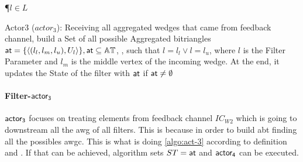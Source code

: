 \begin{algorithm}[h!]
\DontPrintSemicolon
{}
\SetAlgoRefName{[A7]}
\P{$l \in L$}
\FS{$\dwi \subseteq \dw$}
\BlankLine
{}
\PC{$|\ati| \geq 1 \lor \fid$}
\caption[Actor3 ($actor_3$)]{Actor3 ($actor_3$): Receiving all aggregated wedges that came from feedback channel, build a Set of all possible Aggregated bitriangles $\mathsf{at} = \{\left\langle (l_l, l_m, l_u), U_l \right\rangle\}, \mathsf{at} \subseteq \mathbb{AT}$, , such that $l = l_l \lor l = l_u$, where $l$ is the Filter Parameter and $l_m$ is the middle vertex of the incoming wedge. At the end, it updates the State of the filter with $\mathsf{at}$ if $\mathsf{at} \neq \emptyset$}
\label{algo:act-3}
\end{algorithm}

\paragraph{Filter-$\mathsf{actor_3}$} $\mathsf{actor_3}$ focuses on treating elements from feedback channel $IC_{W2}$ which is going to downstream all the \acrshort{awg} of all filters.
This is because in order to build \acrshort{abt} finding all the possibles \acrshort{awgc}. This is what is doing \autoref{algo:act-3} according to definition 
 and . If that can be achieved, algorithm sets $ST = \mathsf{at}$ and $\mathsf{actor_4}$ can be executed.


